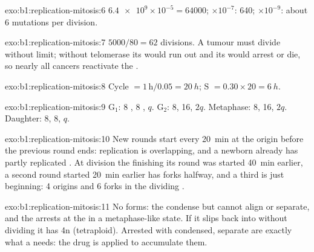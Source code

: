 \begin{solution}{exo:b1:replication-mitosis:6}
$\num{6.4e9}\times 10^{-5} = \num{64000}$; $\times 10^{-7}$: 640;
$\times 10^{-9}$: about 6 mutations per division.
\end{solution}

\begin{solution}{exo:b1:replication-mitosis:7}
$5000/80 = 62$ divisions. A tumour must divide without limit; without
telomerase its  would run out and its  would arrest or
die, so nearly all cancers reactivate the .
\end{solution}

\begin{solution}{exo:b1:replication-mitosis:8}
Cycle $= 1\,\mathrm{h}/0.05 = \qty{20}{h}$; S $= 0.30\times 20 =
\qty{6}{h}$.
\end{solution}

\begin{solution}{exo:b1:replication-mitosis:9}
G$_1$: 8 , 8 , $q$. G$_2$: 8, 16, $2q$. Metaphase:
8, 16, $2q$. Daughter: 8, 8, $q$.
\end{solution}

\begin{solution}{exo:b1:replication-mitosis:10}
New rounds start every \qty{20}{min} at the origin before the
previous round ends: replication is overlapping, and a newborn 
already has partly replicated . At division the  finishing
its round was started \qty{40}{min} earlier, a second round started
\qty{20}{min} earlier has forks halfway, and a third is just
beginning: 4 origins and 6 forks in the dividing .
\end{solution}

\begin{solution}{exo:b1:replication-mitosis:11}
No  forms: the  condense but cannot align or
separate, and the  arrests at the   in a
metaphase-like state. If it slips back into  without
dividing it has 4n  (tetraploid). Arrested  with
condensed, separate  are exactly what a  needs:
the drug is applied to accumulate them.
\end{solution}

